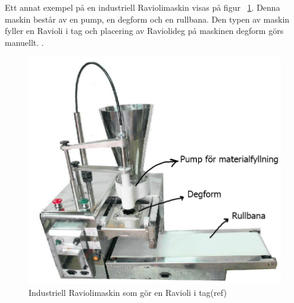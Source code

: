 Ett annat exempel på en industriell Raviolimaskin visas på figur ~\ref{industraviol_2}. Denna maskin består av en pump, en degform och en rullbana. Den typen av maskin fyller en Ravioli i tag och placering av Raviolideg på maskinen degform görs manuellt.
   .
 \begin{figure}[ht]
 	\begin{center}
 		\includegraphics[scale=0.4]{images/industriell_machine_comment.jpg}
 		\caption{Industriell Raviolimaskin som gör en Ravioli i tag(ref)}
 		\label{industraviol_2}	
 	\end{center}
 \end{figure}
 
 

 
